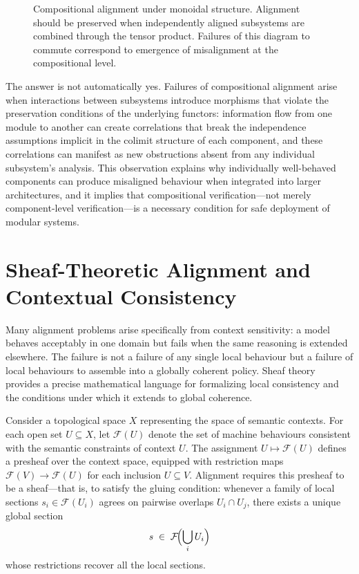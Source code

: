 \documentclass[12pt]{article}
\theoremstyle{definition}
\begin{document}
\begin{figure}[h]
\centering
{}
\caption{Compositional alignment under monoidal structure. Alignment should be
preserved when independently aligned subsystems are combined through the tensor
product. Failures of this diagram to commute correspond to emergence of
misalignment at the compositional level.}
\end{figure}

The answer is not automatically yes. Failures of compositional alignment arise
when interactions between subsystems introduce morphisms that violate the
preservation conditions of the underlying functors: information flow from one
module to another can create correlations that break the independence assumptions
implicit in the colimit structure of each component, and these correlations can
manifest as new obstructions absent from any individual subsystem's analysis.
This observation explains why individually well-behaved components can produce
misaligned behaviour when integrated into larger architectures, and it implies
that compositional verification---not merely component-level verification---is a
necessary condition for safe deployment of modular systems.

\section{Sheaf-Theoretic Alignment and Contextual Consistency}

Many alignment problems arise specifically from context sensitivity: a model
behaves acceptably in one domain but fails when the same reasoning is extended
elsewhere. The failure is not a failure of any single local behaviour but a
failure of local behaviours to assemble into a globally coherent policy. Sheaf
theory provides a precise mathematical language for formalizing local consistency
and the conditions under which it extends to global coherence.

Consider a topological space $X$ representing the space of semantic contexts.
For each open set $U \subseteq X$, let $\mathcal{F}(U)$ denote the set of
machine behaviours consistent with the semantic constraints of context $U$. The
assignment $U \mapsto \mathcal{F}(U)$ defines a presheaf over the context space,
equipped with restriction maps $\mathcal{F}(V) \to \mathcal{F}(U)$ for each
inclusion $U \subseteq V$. Alignment requires this presheaf to be a sheaf---that
is, to satisfy the gluing condition: whenever a family of local sections $s_i
\in \mathcal{F}(U_i)$ agrees on pairwise overlaps $U_i \cap U_j$, there exists
a unique global section
\begin{equation}
  s \;\in\; \mathcal{F}\!\Bigl(\bigcup_i U_i\Bigr)
\end{equation}
whose restrictions recover all the local sections.
\end{document}
